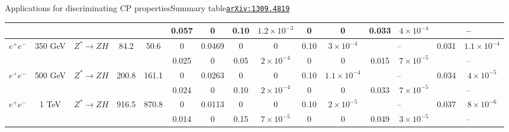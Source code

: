 \documentclass[usenames,dvipsnames,svgnames,table]{beamer}
\newcommand{\arxiv}[1]{\href{http://arxiv.org/abs/#1}{\nolinkurl{arXiv:#1}}}
\newcommand{\snowmass}{\arxiv{1309.4819}}
\begin{document}
\begin{frame}{Applications for discriminating CP properties}{Summary table\hfill\snowmass}
{\begin{tabular}{|lcccc || cccccc || cccc |}
         &               &                            &         &       &  0.057 &  0 & 0.10 & $1.2\times10^{-3}$ &  0 & 0  & 0.033 & $4\!\times\!10^{-4}$ & \multicolumn{2}{c|}{ --  }  \\
\hline
$e^+e^-$ & 350 GeV & $Z^*\to ZH$ & 84.2 &  50.6 &  0 & 0.0469 & 0 & 0  & 0.10  & $3\times10^{-4}$ & \multicolumn{2}{c}{ --  } & 0.031 &  $1.1\!\times\!10^{-4}$ \\
        &               &                            &         &       &  0.025  &  0 & 0.05 & $2\times10^{-4}$ &  0 & 0  & 0.015 & $7\!\times\!10^{-5}$   & \multicolumn{2}{c|}{ --  }   \\
\hline
$e^+e^-$ & 500 GeV & $Z^*\to ZH$ & 200.8 &  161.1 &  0 & 0.0263 & 0 & 0  & 0.10 & $1.1\times10^{-4}$ & \multicolumn{2}{c}{ --  } & 0.034 &  $4\!\times\!10^{-5}$ \\
        &               &                            &         &       &   0.024 &  0 & 0.10 & $2\times10^{-4}$  &  0 & 0  & 0.033 &  $7\!\times\!10^{-5}$ & \multicolumn{2}{c|}{ --  }   \\
\hline
$e^+e^-$ & 1 TeV     & $Z^*\to ZH$ & 916.5 &  870.8 &   0 & 0.0113 & 0 & 0 & 0.10 & $2\times10^{-5}$ & \multicolumn{2}{c}{ --  } & 0.037 &  $8\!\times\!10^{-6}$ \\
        &               &                            &                        &       &  0.014 &  0 & 0.15 & $7\times10^{-5}$  &  0 & 0  & 0.049 & $3\!\times\!10^{-5}$ & \multicolumn{2}{c|}{ --  }  \\
\hline
\hline
\end{tabular}
}
\end{frame}
\end{document}

